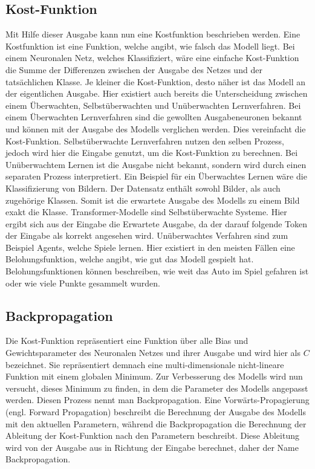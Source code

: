 \subsection{Kost-Funktion}
Mit Hilfe dieser Ausgabe kann nun eine Kostfunktion beschrieben werden.
Eine Kostfunktion ist eine Funktion, welche angibt, wie falsch das Modell liegt.
Bei einem Neuronalen Netz, welches Klassifiziert, wäre eine einfache Kost-Funktion die Summe der Differenzen zwischen der Ausgabe des Netzes und der tatsächlichen Klasse.
Je kleiner die Kost-Funktion, desto näher ist das Modell an der eigentlichen Ausgabe.
Hier existiert auch bereits die Unterscheidung zwischen einem Überwachten, Selbstüberwachten und Unüberwachten Lernverfahren.
Bei einem Überwachten Lernverfahren sind die gewollten Ausgabeneuronen bekannt und können mit der Ausgabe des Modells verglichen werden.
Dies vereinfacht die Kost-Funktion.
Selbstüberwachte Lernverfahren nutzen den selben Prozess, jedoch wird hier die Eingabe genutzt, um die Kost-Funktion zu berechnen.
Bei Unüberwachtem Lernen ist die Ausgabe nicht bekannt, sondern wird durch einen separaten Prozess interpretiert.
Ein Beispiel für ein Überwachtes Lernen wäre die Klassifizierung von Bildern.
Der Datensatz enthält sowohl Bilder, als auch zugehörige Klassen.
Somit ist die erwartete Ausgabe des Modells zu einem Bild exakt die Klasse.
Transformer-Modelle sind Selbstüberwachte Systeme.
Hier ergibt sich aus der Eingabe die Erwartete Ausgabe, da der darauf folgende Token der Eingabe als korrekt angesehen wird.
Unüberwachtes Verfahren sind zum Beispiel Agents, welche Spiele lernen.
Hier existiert in den meisten Fällen eine Belohungsfunktion, welche angibt, wie gut das Modell gespielt hat.
Belohungsfunktionen können beschreiben, wie weit das Auto im Spiel gefahren ist oder wie viele Punkte gesammelt wurden.\\

\subsection{Backpropagation}
Die Kost-Funktion repräsentiert eine Funktion über alle Bias und Gewichtsparameter des Neuronalen Netzes und ihrer Ausgabe und wird hier als $C$ bezeichnet.
Sie repräsentiert demnach eine multi-dimensionale nicht-lineare Funktion mit einem globalen Minimum.
Zur Verbesserung des Modells wird nun versucht, dieses Minimum zu finden, in dem die Parameter des Modells angepasst werden. Diesen Prozess nennt man Backpropagation.
Eine Vorwärts-Propagierung (engl. Forward Propagation) beschreibt die Berechnung der Ausgabe des Modells mit den aktuellen Parametern, während die Backpropagation die Berechnung der Ableitung der Kost-Funktion nach den Parametern beschreibt.
Diese Ableitung wird von der Ausgabe aus in Richtung der Eingabe berechnet, daher der Name Backpropagation.

